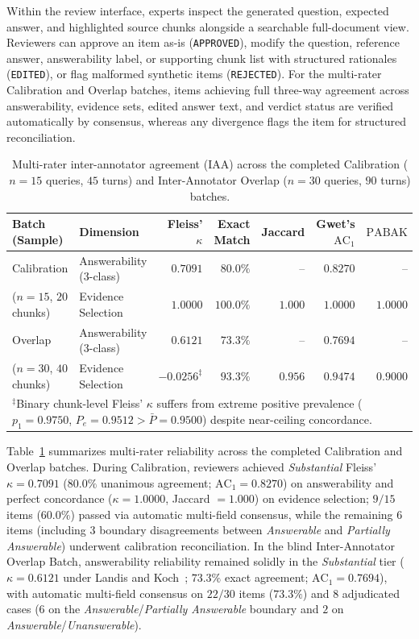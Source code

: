 \documentclass[sn-mathphys, oneside]{sn-jnl}
\newcommand{\artifact}[1]{\nolinkurl{#1}}
\begin{document}
Within the review interface, experts inspect the generated question, expected answer, and highlighted source chunks alongside a searchable full-document view. Reviewers can approve an item as-is (\artifact{APPROVED}), modify the question, reference answer, answerability label, or supporting chunk list with structured rationales (\artifact{EDITED}), or flag malformed synthetic items (\artifact{REJECTED}). For the multi-rater Calibration and Overlap batches, items achieving full three-way agreement across answerability, evidence sets, edited answer text, and verdict status are verified automatically by consensus, whereas any divergence flags the item for structured reconciliation.

\begin{table}[htbp]
\centering
\caption{Multi-rater inter-annotator agreement (IAA) across the completed Calibration ($n = 15$ queries, $45$ turns) and Inter-Annotator Overlap ($n = 30$ queries, $90$ turns) batches.}
\label{tab:iaa_summary}
\begin{tabular}{llrrrrr}
\toprule
Batch (Sample) & Dimension & Fleiss' $\kappa$ & Exact Match & Jaccard & Gwet's $\mathrm{AC}_1$ & $\mathrm{PABAK}$\\
\midrule
Calibration & Answerability (3-class) & $0.7091$ & $80.0\%$ & -- & $0.8270$ & --\\
($n=15$, $20$ chunks) & Evidence Selection & $1.0000$ & $100.0\%$ & $1.000$ & $1.0000$ & $1.0000$\\
\midrule
Overlap & Answerability (3-class) & $0.6121$ & $73.3\%$ & -- & $0.7694$ & --\\
($n=30$, $40$ chunks) & Evidence Selection & $-0.0256^\ddagger$ & $93.3\%$ & $0.956$ & $0.9474$ & $0.9000$\\
\bottomrule
\multicolumn{7}{p{0.92\linewidth}}{\footnotesize $^\ddagger$Binary chunk-level Fleiss' $\kappa$ suffers from extreme positive prevalence ($p_1 = 0.9750$, $P_e = 0.9512 > \bar{P} = 0.9500$) despite near-ceiling concordance.}
\end{tabular}
\end{table}

Table~\ref{tab:iaa_summary} summarizes multi-rater reliability across the completed Calibration and Overlap batches. During Calibration, reviewers achieved \emph{Substantial} Fleiss' $\kappa = 0.7091$ ($80.0\%$ unanimous agreement; $\mathrm{AC}_1 = 0.8270$) on answerability and perfect concordance ($\kappa = 1.0000$, Jaccard $= 1.000$) on evidence selection; $9/15$ items ($60.0\%$) passed via automatic multi-field consensus, while the remaining $6$ items (including $3$ boundary disagreements between \emph{Answerable} and \emph{Partially Answerable}) underwent calibration reconciliation. In the blind Inter-Annotator Overlap Batch, answerability reliability remained solidly in the \emph{Substantial} tier ($\kappa = 0.6121$ under Landis and Koch~\cite{landis1977measurement}; $73.3\%$ exact agreement; $\mathrm{AC}_1 = 0.7694$), with automatic multi-field consensus on $22/30$ items ($73.3\%$) and $8$ adjudicated cases ($6$ on the \emph{Answerable}/\emph{Partially Answerable} boundary and $2$ on \emph{Answerable}/\emph{Unanswerable}).
\end{document}
